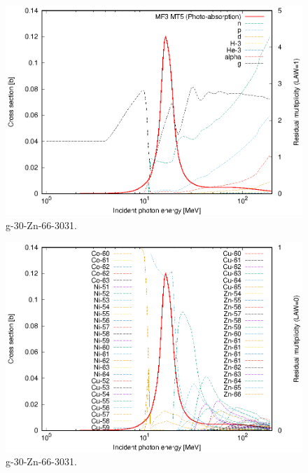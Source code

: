 \begin{figure}
 \includegraphics[width=\linewidth]{eps/g_30-Zn-66_3031.eps}
  \caption{g-30-Zn-66-3031.}
\end{figure}
\begin{figure}
 \includegraphics[width=\linewidth]{eps-law0/g_30-Zn-66_3031.eps}
 \caption{g-30-Zn-66-3031.}
\end{figure}
\newpage \clearpage

